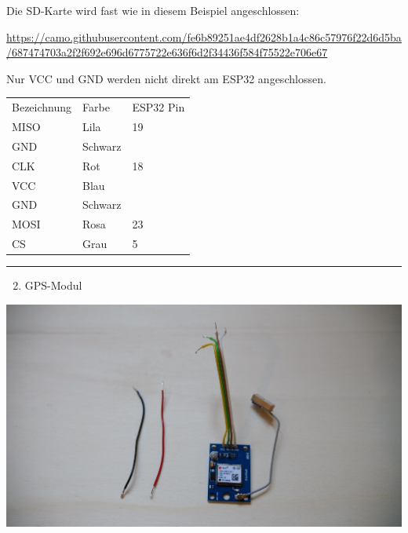 \documentclass[
]{article}
\providecommand{\tightlist}{%
  \setlength{\itemsep}{0pt}\setlength{\parskip}{0pt}}
\begin{document}
{Die SD-Karte wird fast wie in diesem Beispiel angeschlossen:}

{\href{https://www.google.com/url?q=https://camo.githubusercontent.com/fe6b89251ae4df2628b1a4c86c57976f22d6d5ba/687474703a2f2f692e696d6775722e636f6d2f34436f584f75522e706e67\&sa=D\&ust=1588976963798000}{https://camo.githubusercontent.com/fe6b89251ae4df2628b1a4c86c57976f22d6d5ba/687474703a2f2f692e696d6775722e636f6d2f34436f584f75522e706e67}}

{}

{Nur VCC und GND werden nicht direkt am ESP32 angeschlossen.}

{}

\protect\hypertarget{t.dfc647e596c2e4387a04c10c877e17b08bda1dd3}{}{}\protect\hypertarget{t.1}{}{}

\begin{longtable}[]{@{}lll@{}}
\toprule
\endhead
{Bezeichnung} & {Farbe} & {ESP32 Pin}\tabularnewline
{MISO} & {Lila} & {19}\tabularnewline
{GND} & {Schwarz} & {}\tabularnewline
{CLK} & {Rot} & {18}\tabularnewline
{VCC} & {Blau} & {}\tabularnewline
{GND} & {Schwarz} & {}\tabularnewline
{MOSI} & {Rosa} & {23}\tabularnewline
{CS} & {Grau} & {5}\tabularnewline
\bottomrule
\end{longtable}

\begin{center}\rule{0.5\linewidth}{0.5pt}\end{center}

{}

{}

\begin{enumerate}
\setcounter{enumi}{1}
\tightlist
\item
  {GPS-Modul}
\end{enumerate}

{\includegraphics{images/image9.jpg}}
\end{document}
